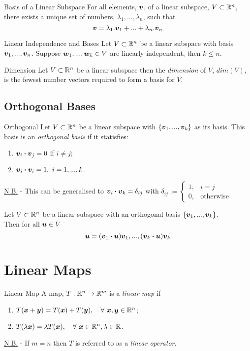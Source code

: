 \documentclass[11pt,a4paper]{article}
\begin{document}
\subtitle{Theorem 4.05 - }{Basis of a Linear Subspace}
For all elements, $\boldsymbol{v}$, of a linear subspace, $V \subset \mathbb{R}^n$, there exists a \underline{unique} set of numbers, $\lambda_1, ... , \lambda_n$, such that
$$\boldsymbol{v} = \lambda_1.\boldsymbol{v}_1 + ... + \lambda_n.\boldsymbol{v}_n$$

\subtitle{Theorem 4.06 - }{Linear Independence and Bases}
Let $V \subset \mathbb{R}^n$ be a linear subspace with basis ${\boldsymbol{v}_1, ... , \boldsymbol{v}_n}$. Suppose $\boldsymbol{w}_1 , ... , \boldsymbol{w}_k \in V$ are linearly independent, then $k \leq n$. \\

\subtitle{Definition 4.07 - }{Dimension}
Let $V \subset \mathbb{R}^n$ be a linear subspace then the \textit{dimension} of $V$, $dim(V)$, is the fewest number vectors required to form a basis for $V$.

\subsection{Orthogonal Bases}
%
\subtitle{Definition 4.08 - }{Orthogonal}
Let $V \subset \mathbb{R}^n$ be a linear subspace with $\{\boldsymbol{v}_1 , ... , \boldsymbol{v}_k\}$ as its basis. This basis is an \textit{orthogonal basis} if it statisfies:
\begin{enumerate}[label=\roman*)]
  \item $\boldsymbol{v}_i \boldsymbol{\cdot} \boldsymbol{v}_j = 0$ if $i \not = j$;
  \item $\boldsymbol{v}_i \boldsymbol{\cdot} \boldsymbol{v}_i = 1,\ i = 1, ... , k$.
\end{enumerate}
\underline{N.B.} - This can be generalised to $\boldsymbol{v}_i \boldsymbol{\cdot} \boldsymbol{v}_k = \delta_{ij}$ with $\delta_{ij} := \begin{cases} 1, & i = j \\ 0, & \mathrm{otherwise}\end{cases}$

\subtitle{Theorem 4.09}{}
Let $V \subset \mathbb{R}^n$ be a linear subspace with an orthogonal basis $\{\boldsymbol{v}_1 , ... , \boldsymbol{v}_k\}$. \\
Then for all $\boldsymbol{u} \in V$ $$\boldsymbol{u} = (\boldsymbol{v}_1 \boldsymbol{\cdot} \boldsymbol{u}) \boldsymbol{v}_1 , ... , (\boldsymbol{v}_k \boldsymbol{\cdot} \boldsymbol{u}) \boldsymbol{v}_k$$

\section{Linear Maps}

\subtitle{Definition 5.01 - }{Linear Map}
A map, $T : \mathbb{R}^n \to \mathbb{R}^m$ is a \textit{linear map} if
\begin{enumerate}[label=\roman*)]
  \item $T(\boldsymbol{x} + \boldsymbol{y}) = T(\boldsymbol{x}) + T(\boldsymbol{y}),\quad \forall\ \boldsymbol{x}, \boldsymbol{y} \in \mathbb{R}^n$;
  \item $T(\lambda\boldsymbol{x}) = \lambda T(\boldsymbol{x}),\quad \forall\ \boldsymbol{x} \in \mathbb{R}^n, \lambda \in \mathbb{R}$.
\end{enumerate}
\underline{N.B.} - If $m = n$ then $T$ is referred to as a \textit{linear operator}. \\
\end{document}
